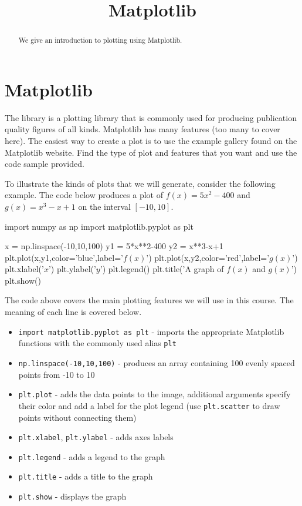 \documentclass{ximera}
\title{Matplotlib}
\begin{document}
  
\begin{abstract}  
We give an introduction to plotting using Matplotlib.
\end{abstract}  
\maketitle

\section{Matplotlib}

The  library is a plotting library that is commonly used for producing publication quality figures of all kinds. Matplotlib has many features (too many to cover here). The easiest way to create a plot is to use the example gallery found on the Matplotlib website. Find the type of plot and features that you want and use the code sample provided.

To illustrate the kinds of plots that we will generate, consider the following example. The code below produces a plot of $f(x)=5x^2-400$ and $g(x)=x^3-x+1$ on the interval $[-10,10]$. 

\begin{sageCell}
import numpy as np
import matplotlib.pyplot as plt

x = np.linspace(-10,10,100)
y1 = 5*x**2-400
y2 = x**3-x+1
plt.plot(x,y1,color='blue',label='$f(x)$')
plt.plot(x,y2,color='red',label='$g(x)$')
plt.xlabel('$x$')
plt.ylabel('$y$')
plt.legend()
plt.title('A graph of $f(x)$ and $g(x)$')
plt.show()
\end{sageCell}

The code above covers the main plotting features we will use in this course. The meaning of each line is covered below.

\begin{itemize}
	\item \verb|import matplotlib.pyplot as plt| - imports the appropriate Matplotlib functions with the commonly used alias \verb|plt|
	\item \verb|np.linspace(-10,10,100)| - produces an array containing 100 evenly spaced points from -10 to 10
	\item \verb|plt.plot| - adds the data points to the image, additional arguments specify their color and add a label for the plot legend (use \verb|plt.scatter| to draw points without connecting them)
	\item \verb|plt.xlabel|, \verb|plt.ylabel| - adds axes labels
	\item \verb|plt.legend| - adds a legend to the graph
	\item \verb|plt.title| - adds a title to the graph
	\item \verb|plt.show| - displays the graph
\end{itemize}
\end{document}
